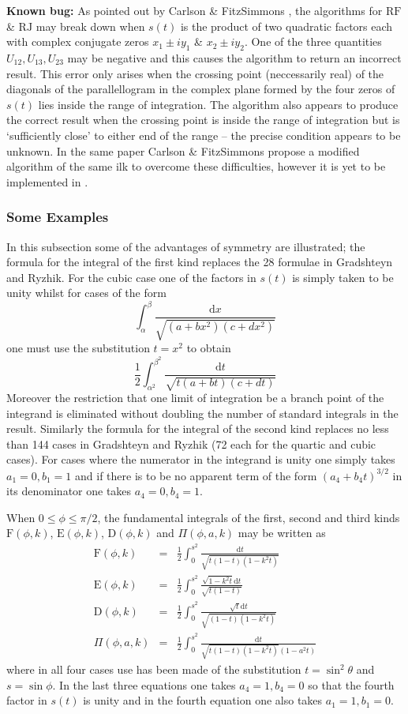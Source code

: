 \textbf{Known bug:} As pointed out by Carlson \& FitzSimmons \cite{CarlsonFitzSimmons:00},
the algorithms for $\mathrm{RF}$ \& $\mathrm{RJ}$ may break down when $s(t)$ is the product
of two quadratic factors each with complex conjugate zeros $x_1\pm i y_1$ \&
$x_2\pm i y_2$. One of the three quantities
$U_{12}, U_{13}, U_{23}$ may be negative and this causes the algorithm to return an
incorrect result. This error only arises when the crossing point (neccessarily real) of
the diagonals of the parallellogram in the complex plane formed by the four zeros of
$s(t)$  lies inside the range of integration. The algorithm also appears to produce the
correct result when the crossing point is inside the range of integration but is
`sufficiently close' to either end of the range -- the precise condition appears to be
unknown.
In the same paper Carlson \& FitzSimmons propose a modified algorithm of the same ilk
to overcome these difficulties, however it is yet to be implemented in \REDUCE.

\subsubsection{Some Examples}
In this subsection some of the advantages of symmetry are illustrated; the formula for the
integral of the first kind replaces the 28 formulae in Gradshteyn and Ryzhik. For the cubic
case one of the factors in $s(t)$ is simply taken to be unity whilst for cases of the form
\[\int_\alpha^\beta \frac{\mathrm{d}x}{\sqrt{(a+b x^2)(c+d x^2)}}\]
one must use the substitution $t=x^2$ to obtain
\[\frac{1}{2}\int_{\alpha^2}^{\beta^2} \frac{\mathrm{d}t}{\sqrt{t(a+b t)(c+d t)}}\]
Moreover the restriction that one limit of integration be a branch point of the integrand is
eliminated without doubling the number of standard integrals in the result.
Similarly the formula for the integral of the second kind replaces no less than 144 cases
in Gradshteyn and Ryzhik (72 each for the quartic and cubic cases). For cases where the
numerator in the integrand is unity one simply takes $a_1=0, b_1=1$ and if there is to be no
apparent term of the form $(a_4+b_4t)^{3/2}$ in its denominator one takes $a_4=0, b_4=1$.

When $0 \leq \phi \leq \pi/2$, the fundamental integrals of the first, second
and third kinds $\mathrm{F}(\phi,k)$, $\mathrm{E}(\phi,k)$, $\mathrm{D}(\phi,k)$
and $\Pi(\phi,a,k)$ may be written as
\begin{eqnarray*}
\mathrm{F}(\phi,k) &=& \frac{1}{2}\int_0^{s^2} \frac{\mathrm{d}t}{\sqrt{t(1-t)(1-k^2t)}}\\  
\mathrm{E}(\phi,k) &=& \frac{1}{2}\int_0^{s^2} \frac{\sqrt{1-k^2t}\mathrm{d}t}{\sqrt{t(1-t)}}\\
\mathrm{D}(\phi,k) &=& \frac{1}{2}\int_0^{s^2} \frac{\sqrt{t}\mathrm{d}t}{\sqrt{(1-t)(1-k^2t)}}\\
\Pi(\phi,a,k) &=& \frac{1}{2}\int_0^{s^2} \frac{\mathrm{d}t}{\sqrt{t(1-t)(1-k^2t)}(1-a^2t)}
\end{eqnarray*}
where in all four cases use has been made of the substitution $t=\sin^2 \theta$
and $s=\sin\phi$. In the last three equations one takes $a_4=1, b_4 =0$ so that
the fourth factor in $s(t)$ is unity and in the fourth equation one also takes
$a_1=1,b_1=0$.

